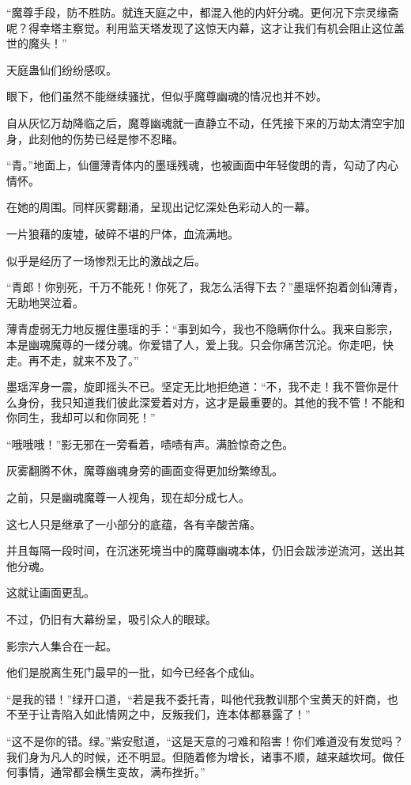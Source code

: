\begin{this_body}
“魔尊手段，防不胜防。就连天庭之中，都混入他的内奸分魂。更何况下宗灵缘斋呢？得幸塔主察觉。利用监天塔发现了这惊天内幕，这才让我们有机会阻止这位盖世的魔头！”

天庭蛊仙们纷纷感叹。

眼下，他们虽然不能继续骚扰，但似乎魔尊幽魂的情况也并不妙。

自从灰忆万劫降临之后，魔尊幽魂就一直静立不动，任凭接下来的万劫太清空宇加身，此刻他的伤势已经是惨不忍睹。

“青。”地面上，仙僵薄青体内的墨瑶残魂，也被画面中年轻俊朗的青，勾动了内心情怀。

在她的周围。同样灰雾翻涌，呈现出记忆深处色彩动人的一幕。

一片狼藉的废墟，破碎不堪的尸体，血流满地。

似乎是经历了一场惨烈无比的激战之后。

“青郎！你别死，千万不能死！你死了，我怎么活得下去？”墨瑶怀抱着剑仙薄青，无助地哭泣着。

薄青虚弱无力地反握住墨瑶的手：“事到如今，我也不隐瞒你什么。我来自影宗，本是幽魂魔尊的一缕分魂。你爱错了人，爱上我。只会你痛苦沉沦。你走吧，快走。再不走，就来不及了。”

墨瑶浑身一震，旋即摇头不已。坚定无比地拒绝道：“不，我不走！我不管你是什么身份，我只知道我们彼此深爱着对方，这才是最重要的。其他的我不管！不能和你同生，我却可以和你同死！”

“哦哦哦！”影无邪在一旁看着，啧啧有声。满脸惊奇之色。

灰雾翻腾不休，魔尊幽魂身旁的画面变得更加纷繁缭乱。

之前，只是幽魂魔尊一人视角，现在却分成七人。

这七人只是继承了一小部分的底蕴，各有辛酸苦痛。

并且每隔一段时间，在沉迷死境当中的魔尊幽魂本体，仍旧会跋涉逆流河，送出其他分魂。

这就让画面更乱。

不过，仍旧有大幕纷呈，吸引众人的眼球。

影宗六人集合在一起。

他们是脱离生死门最早的一批，如今已经各个成仙。

“是我的错！”绿开口道，“若是我不委托青，叫他代我教训那个宝黄天的奸商，也不至于让青陷入如此情网之中，反叛我们，连本体都暴露了！”

“这不是你的错。绿。”紫安慰道，“这是天意的刁难和陷害！你们难道没有发觉吗？我们身为凡人的时候，还不明显。但随着修为增长，诸事不顺，越来越坎坷。做任何事情，通常都会横生变故，满布挫折。”


\end{this_body}
